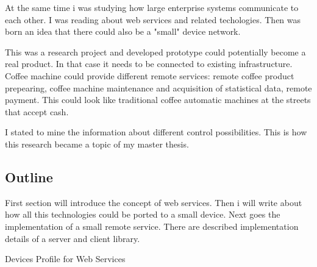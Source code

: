 At the same time i was studying how large enterprise systems communicate to each other. I was reading about web services and related techologies.
Then was born an idea that there could also be a "small" device network. 

This was a research project and developed prototype could potentially become a real product.
In that case it needs to be connected to existing infrastructure.
Coffee machine could provide different remote services: remote coffee product prepearing, coffee machine maintenance and acquisition of statistical data, remote payment.
This could look like traditional coffee automatic machines at the streets that accept cash.

I stated to mine the information about different control possibilities.
This is how this research became a topic of my master thesis. 

\subsection{Outline}

First section will introduce the concept of web services.
Then i will write about how all this technologies could be ported to a small device.
Next goes the implementation of a small remote service. There are described implementation details of a server and client library.

Devices Profile for Web Services
